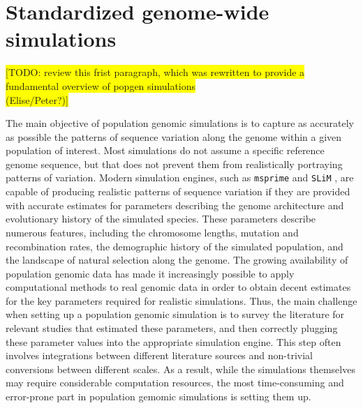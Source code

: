 \documentclass[hidelinks]{article}
\begin{document}
\hypertarget{sec2}{%
	\section*{Standardized genome-wide simulations}\label{sec:std-sim}}



%

\colorbox{yellow}{[TODO:  review this frist paragraph, which was rewritten to
	provide a fundamental overview of popgen simulations}\\
\colorbox{yellow}{ (Elise/Peter?)]}
	
	
The main objective of population genomic simulations is to capture as accurately as possible the patterns of sequence variation along the genome within a given population of interest. Most simulations do not assume a specific reference genome sequence, but that does not prevent them from realistically portraying patterns of variation. Modern simulation engines, such as \texttt{msprime} \citep{Kelleher2016,Nelson2020} and \texttt{SLiM} \citep{Haller2019}, are capable of producing realistic patterns of sequence variation if they are provided with accurate estimates for parameters describing the genome architecture and evolutionary history of the simulated species. These parameters describe numerous features, including the chromosome lengths,  mutation and recombination rates, the demographic history of the simulated population, and the landscape of natural selection along the genome. The growing availability of population genomic data has made it increasingly possible to apply computational methods to real genomic data in order to obtain decent estimates for the key parameters required for realistic simulations. Thus, the main challenge when setting up a population genomic simulation is to survey the literature for relevant studies that estimated these parameters, and then correctly plugging these parameter values into the appropriate simulation engine. This step often involves integrations between different literature sources and non-trivial conversions between different scales. As a result, while the simulations themselves may require considerable computation resources, the most time-consuming and error-prone part in population gemomic simulations is setting them up.
\end{document}

